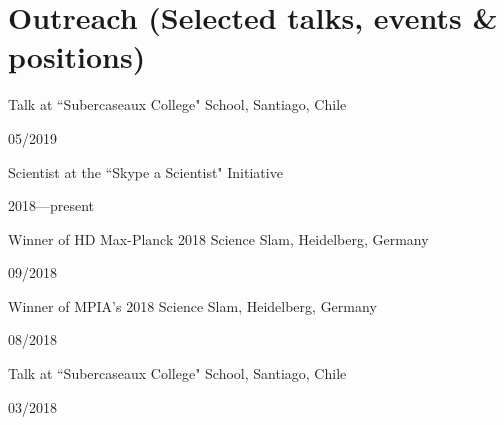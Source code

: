 \documentclass[12pt, a4paper]{article} %
\begin{document}
\section*{Outreach (Selected talks, events \& positions)}

\begin{minipage}[t]{0.7\textwidth}
\begin{flushleft}%
  \setlength{\leftskip}{0.2cm}%
Talk at ``Subercaseaux College" School, Santiago, Chile
\end{flushleft}
\end{minipage}
\begin{minipage}[t]{0.3\textwidth}
\hfill 05/2019
\end{minipage}

\begin{minipage}[t]{0.7\textwidth}
\begin{flushleft}%
  \setlength{\leftskip}{0.2cm}%
Scientist at the ``Skype a Scientist" Initiative
\end{flushleft}
\end{minipage}
\begin{minipage}[t]{0.3\textwidth}
\hfill 2018---present
\end{minipage}

\begin{minipage}[t]{0.7\textwidth}
\begin{flushleft}%
  \setlength{\leftskip}{0.2cm}%
Winner of HD Max-Planck 2018 Science Slam, Heidelberg, Germany 
\end{flushleft}
\end{minipage}
\begin{minipage}[t]{0.3\textwidth}
\hfill 09/2018
\end{minipage}

\begin{minipage}[t]{0.7\textwidth}
\begin{flushleft}%
  \setlength{\leftskip}{0.2cm}%
Winner of MPIA's 2018 Science Slam, Heidelberg, Germany 
\end{flushleft}
\end{minipage}
\begin{minipage}[t]{0.3\textwidth}
\hfill 08/2018
\end{minipage}

\begin{minipage}[t]{0.7\textwidth}
\begin{flushleft}%
  \setlength{\leftskip}{0.2cm}%
Talk at ``Subercaseaux College" School, Santiago, Chile
\end{flushleft}
\end{minipage}
\begin{minipage}[t]{0.3\textwidth}
\hfill 03/2018
\end{minipage}
\end{document}
